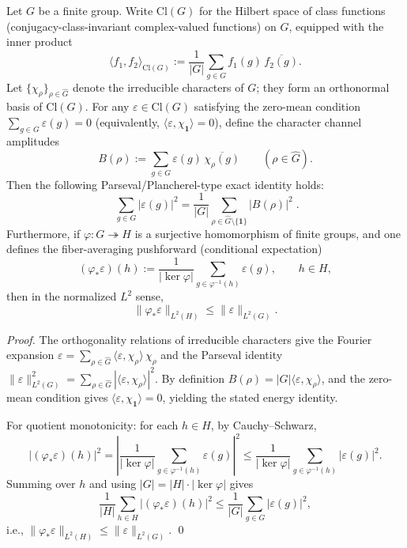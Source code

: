 \begin{proposition}\label{prop:kernel-chebotarev-plancherel-nonabelian}
Let \(G\) be a finite group. Write \(\mathrm{Cl}(G)\) for the Hilbert space of class functions (conjugacy-class-invariant complex-valued functions) on \(G\), equipped with the inner product
\[
\langle f_1,f_2\rangle_{\mathrm{Cl}(G)}
:=\frac{1}{|G|}\sum_{g\in G} f_1(g)\,\overline{f_2(g)}.
\]
Let \(\{\chi_\rho\}_{\rho\in\widehat G}\) denote the irreducible characters of \(G\); they form an orthonormal basis of \(\mathrm{Cl}(G)\).
For any \(\varepsilon\in \mathrm{Cl}(G)\) satisfying the zero-mean condition \(\sum_{g\in G}\varepsilon(g)=0\) (equivalently, \(\langle \varepsilon,\chi_{\mathbf{1}}\rangle=0\)), define the character channel amplitudes
\[
B(\rho):=\sum_{g\in G}\varepsilon(g)\,\overline{\chi_\rho(g)}
\qquad(\rho\in\widehat G).
\]
Then the following Parseval/Plancherel-type exact identity holds:
\[
\boxed{\;
\sum_{g\in G}\bigl|\varepsilon(g)\bigr|^2
=\frac{1}{|G|}\sum_{\rho\in\widehat G\setminus\{\mathbf{1}\}}\bigl|B(\rho)\bigr|^2\; }.
\]
Furthermore, if \(\varphi:G\twoheadrightarrow H\) is a surjective homomorphism of finite groups, and one defines the fiber-averaging pushforward (conditional expectation)
\[
(\varphi_\ast\varepsilon)(h):=\frac{1}{|\ker\varphi|}\sum_{g\in \varphi^{-1}(h)}\varepsilon(g),
\qquad h\in H,
\]
then in the normalized \(L^2\) sense,
\[
\bigl\|\varphi_\ast\varepsilon\bigr\|_{L^2(H)}
\le
\bigl\|\varepsilon\bigr\|_{L^2(G)}.
\]
\end{proposition}

\begin{proof}
The orthogonality relations of irreducible characters give the Fourier expansion
\(
\varepsilon=\sum_{\rho\in\widehat G}\langle \varepsilon,\chi_\rho\rangle\,\chi_\rho
\)
and the Parseval identity
\(
\|\varepsilon\|_{L^2(G)}^2=\sum_{\rho\in\widehat G}|\langle \varepsilon,\chi_\rho\rangle|^2
\).
By definition \(B(\rho)=|G|\langle \varepsilon,\chi_\rho\rangle\), and the zero-mean condition gives \(\langle \varepsilon,\chi_{\mathbf{1}}\rangle=0\), yielding the stated energy identity.

For quotient monotonicity: for each \(h\in H\), by Cauchy--Schwarz,
\[
\bigl|(\varphi_\ast\varepsilon)(h)\bigr|^2
=\left|\frac{1}{|\ker\varphi|}\sum_{g\in\varphi^{-1}(h)}\varepsilon(g)\right|^2
\le
\frac{1}{|\ker\varphi|}\sum_{g\in\varphi^{-1}(h)}|\varepsilon(g)|^2.
\]
Summing over \(h\) and using \(|G|=|H|\cdot|\ker\varphi|\) gives
\[
\frac{1}{|H|}\sum_{h\in H}\bigl|(\varphi_\ast\varepsilon)(h)\bigr|^2
\le
\frac{1}{|G|}\sum_{g\in G}|\varepsilon(g)|^2,
\]
i.e., \(\|\varphi_\ast\varepsilon\|_{L^2(H)}\le \|\varepsilon\|_{L^2(G)}\). \qed
\end{proof}

